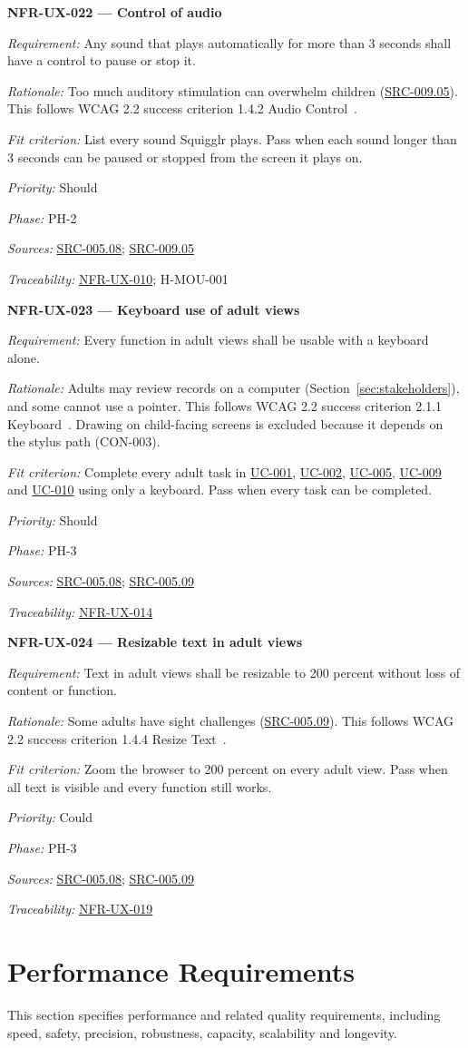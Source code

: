 \documentclass[12pt]{article}
\renewcommand{\_}{\textunderscore\allowbreak}%
\newcommand{\ucref}[1]{\hyperref[uc:#1]{\mbox{UC-#1}}}
\newenvironment{srsrequirement}[2]{%
  \par\medskip\noindent\phantomsection\label{req:#1}%
  \textbf{#1 --- #2}\par\nobreak\smallskip }{\par\medskip}
\newcommand{\reqfield}[2]{\noindent\textit{#1:} #2\par}
\newcommand{\reqshall}[1]{\reqfield{Requirement}{#1}}
\newcommand{\reqrationale}[1]{\reqfield{Rationale}{#1}}
\newcommand{\reqfit}[1]{\reqfield{Fit criterion}{#1}}
\newcommand{\reqpriority}[1]{\reqfield{Priority}{#1}}
\newcommand{\reqphase}[1]{\reqfield{Phase}{#1}}
\newcommand{\reqsources}[1]{\reqfield{Sources}{#1}}
\newcommand{\reqtraces}[1]{\reqfield{Traceability}{#1}}
\newcommand{\reqref}[1]{\hyperref[req:#1]{#1}}
\newcommand{\srcref}[1]{\hyperref[src:#1]{SRC-#1}}
\providecommand{\ucref}[1]{\hyperref[uc:#1]{UC-#1}}
\begin{document}
\begin{srsrequirement}{NFR-UX-022}{Control of audio}
  \reqshall{Any sound that plays automatically for more than 3 seconds shall
have a control to pause or stop it.} \reqrationale{Too much auditory stimulation
can overwhelm children (\srcref{009.05}). This follows WCAG 2.2 success
criterion 1.4.2 Audio Control~\cite{wcag22}.} \reqfit{List every sound Squigglr
plays. Pass when each sound longer than 3 seconds can be paused or stopped from
the screen it plays on.}
  \reqpriority{Should}
  \reqphase{PH-2}
  \reqsources{\srcref{005.08}; \srcref{009.05}} \reqtraces{\reqref{NFR-UX-010};
  H-MOU-001}
\end{srsrequirement}

\begin{srsrequirement}{NFR-UX-023}{Keyboard use of adult views}
  \reqshall{Every function in adult views shall be usable with a keyboard
alone.} \reqrationale{Adults may review records on a computer
(Section~\ref{sec:stakeholders}), and some cannot use a pointer. This follows
WCAG 2.2 success criterion 2.1.1 Keyboard~\cite{wcag22}. Drawing on child-facing
screens is excluded because it depends on the stylus path (CON-003).}
\reqfit{Complete every adult task in \ucref{001}, \ucref{002}, \ucref{005},
\ucref{009} and \ucref{010} using only a keyboard. Pass when every task can be
completed.}
  \reqpriority{Should}
  \reqphase{PH-3}
  \reqsources{\srcref{005.08}; \srcref{005.09}} \reqtraces{\reqref{NFR-UX-014}}
\end{srsrequirement}

\begin{srsrequirement}{NFR-UX-024}{Resizable text in adult views}
  \reqshall{Text in adult views shall be resizable to 200 percent without loss
of content or function.} \reqrationale{Some adults have sight challenges
(\srcref{005.09}). This follows WCAG 2.2 success criterion 1.4.4 Resize
Text~\cite{wcag22}.} \reqfit{Zoom the browser to 200 percent on every adult
view. Pass when all text is visible and every function still works.}
  \reqpriority{Could}
  \reqphase{PH-3}
  \reqsources{\srcref{005.08}; \srcref{005.09}} \reqtraces{\reqref{NFR-UX-019}}
\end{srsrequirement}
\endgroup

\section{Performance Requirements}
\label{sec:performance}
This section specifies performance and related quality requirements, including
speed, safety, precision, robustness, capacity, scalability and longevity.
\end{document}
